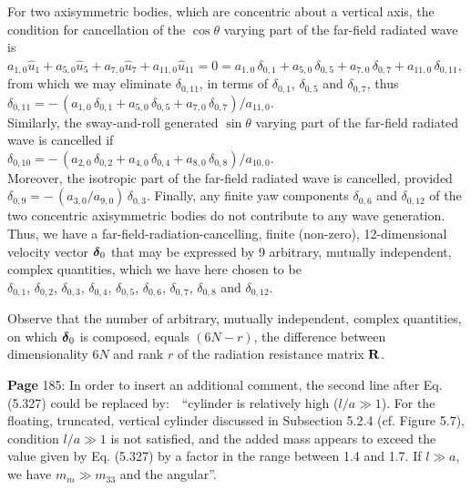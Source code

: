 \documentclass[a4paper,12pt]{article}
\newcommand{\bdelta}{\mbox{\boldmath ${\rm \delta}$}}
\begin{document}
For two axisymmetric bodies, which are concentric about a vertical axis, the condition for cancellation of the $\cos \theta$ varying part of the far-field radiated wave is \\
 $a_{1,0}\hat u_1 + a_{5,0}\hat u_5 + a_{7,0}\hat u_7 + a_{11,0}\hat u_{11} = 0 = a_{1,0}\, \delta_{0,1} + a_{5,0}\, \delta_{0,5} + a_{7,0}\, \delta_{0,7} + a_{11,0}\, \delta_{0,11}$, from which we may eliminate $\delta_{0,11}$, in terms of $\delta_{0,1}$, $\delta_{0,5}$ and $\delta_{0,7}$, thus \\
$\delta_{0,11} = - \, (a_{1,0}\, \delta_{0,1} + a_{5,0}\, \delta_{0,5} + a_{7,0}\, \delta_{0,7})/a_{11,0}$. \\
Similarly, the sway-and-roll generated $\sin \theta$ varying part of the far-field radiated wave is cancelled if \\
$\delta_{0,10} = - \, (a_{2,0}\, \delta_{0,2} + a_{4,0}\, \delta_{0,4} + a_{8,0}\, \delta_{0,8})/a_{10,0}$. \\
Moreover, the isotropic part of the far-field radiated wave is cancelled, provided $\delta_{0,9} = - \, (a_{3,0}/a_{9,0})\, \delta_{0,3}$. Finally, any finite yaw components $\delta_{0,6}$ and $\delta_{0,12}$ of the two concentric axisymmetric bodies do not contribute to any wave generation. Thus, we have a far-field-radiation-cancelling, finite (non-zero), 12-dimensional velocity vector $\bdelta_0$ that may be expressed by 9 arbitrary, mutually independent, complex quantities, which we have here chosen to be \\ $\delta_{0,1}$, $\delta_{0,2}$, $\delta_{0,3}$, $\delta_{0,4}$, $\delta_{0,5}$, $\delta_{0,6}$, $\delta_{0,7}$, $\delta_{0,8}$ and $\delta_{0,12}$.

Observe that the number of arbitrary, mutually independent, complex quantities, on which $\bdelta_0$ is composed, equals $(6N - r)$, the difference between dimensionality $6N$ and rank $r$ of the radiation resistance matrix $\bf R$. 
\vspace{0.3cm} %

\noindent %
{\bf Page} 185: In order to insert an additional comment, the second line after Eq. (5.327) could be replaced by: \,\,
\vspace{0.2cm}
\newline \noindent 
``cylinder is relatively high ($l/a \gg 1$). For the floating, truncated, vertical cylinder discussed in Subsection 5.2.4 (cf. Figure 5.7), condition $l/a \gg 1$ is not satisfied, and the added mass appears to exceed the value given by Eq. (5.327) by a factor in the range between 1.4 and 1.7. If $l \gg a$, we have $m_m \gg m_{33}$ and the angular''. %
\vspace{0.4cm}
\end{document}

